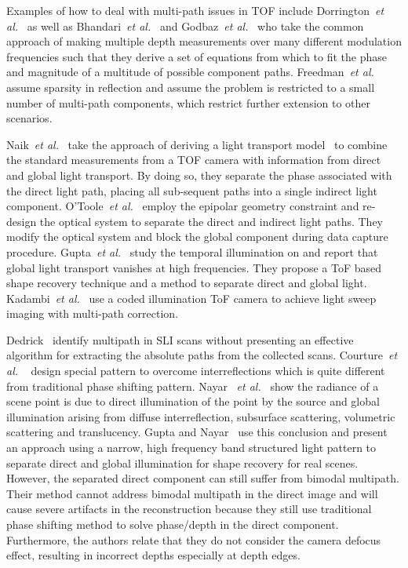 \documentclass[10pt]{article}
\begin{document}
Examples of how to deal with multi-path issues in TOF include Dorrington~{\it et al.}~\cite{dorrington2011separating} as well as Bhandari~{\it et al.}~\cite{bhandari2013multifrequency} and Godbaz~{\it et al.}~\cite{godbaz2012closed} who take the common approach of making multiple depth measurements over many different modulation frequencies such that they derive a set of equations from which to fit the phase and magnitude of a multitude of possible component paths. Freedman~{\it et al.}~\cite{freedman2014sra} assume sparsity in reflection and assume the problem is restricted to a small number of multi-path components, which restrict further extension to other scenarios. 

Naik~{\it et al.}~\cite{naik2015light} take the approach of deriving a light transport model~\cite{Nayar:2006:FSD:1141911.1141977} to combine the standard measurements from a TOF camera with information from direct and global light transport.  By doing so, they separate the phase associated with the direct light path, placing all sub-sequent paths into a single indirect light component.  O'Toole~{\it et al.}~\cite{o20143d,o2014temporal} employ the epipolar geometry constraint and re-design the optical system to separate the direct and indirect light paths. They modify the optical system and block the global component during data capture procedure.  Gupta~{\it et al.}~\cite{gupta2015phasor} study the temporal illumination on and report that global light transport vanishes at high frequencies. They propose a ToF based shape recovery technique and a method to separate direct and global light. Kadambi~{\it et al.}~\cite{kadambi2013coded} use a coded illumination ToF camera to achieve light sweep imaging with multi-path correction. 

Dedrick~\cite{dedrick2011improving} identify multipath in SLI scans without presenting an effective algorithm for extracting the absolute paths from the collected scans. Courture~{\it et al.} ~\cite{couture2011unstructured} design special pattern to overcome interreflections which is quite different from traditional phase shifting pattern. Nayar ~{\it et al.}~\cite{nayar2006fast} show the radiance of a scene point is due to direct illumination of the point by the source and global illumination arising from diffuse interreflection, subsurface scattering, volumetric scattering and translucency. Gupta and Nayar~\cite{gupta2012micro} use this conclusion and present an approach using a narrow, high frequency band structured light pattern to separate direct and global illumination for shape recovery for real scenes. However, the separated direct component can still suffer from bimodal multipath. Their method cannot address bimodal multipath in the direct image and will cause severe artifacts in the reconstruction because they still use traditional phase shifting method to solve phase/depth in the direct component. Furthermore, the authors relate that they do not consider the camera defocus effect, resulting in incorrect depths especially at depth edges. 
\end{document}
